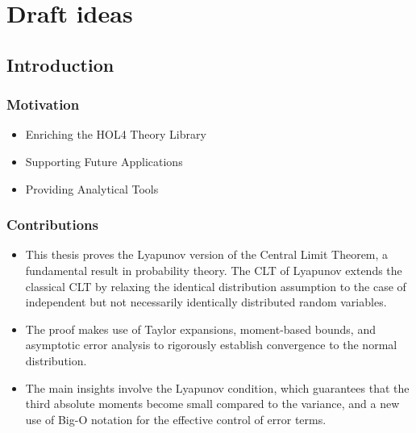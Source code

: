 \section*{Draft ideas}
\subsection{Introduction}
\cite{tian2022assumption}
\cite{qasim2016formalization}

\subsubsection{Motivation}
\begin{itemize}
    \item Enriching the HOL4 Theory Library
    \item Supporting Future Applications
    \item Providing Analytical Tools
\end{itemize}

\subsubsection{Contributions}
\begin{itemize}
    \item This thesis proves the Lyapunov version of the Central Limit Theorem, a fundamental result in probability theory. The CLT of Lyapunov extends the classical CLT by relaxing the identical distribution assumption to the case of independent but not necessarily identically distributed random variables.
    \item The proof makes use of Taylor expansions, moment-based bounds, and asymptotic error analysis to rigorously establish convergence to the normal distribution.
    \item The main insights involve the Lyapunov condition, which guarantees that the third absolute moments become small compared to the variance, and a new use of Big-O notation for the effective control of error terms.
\end{itemize}


